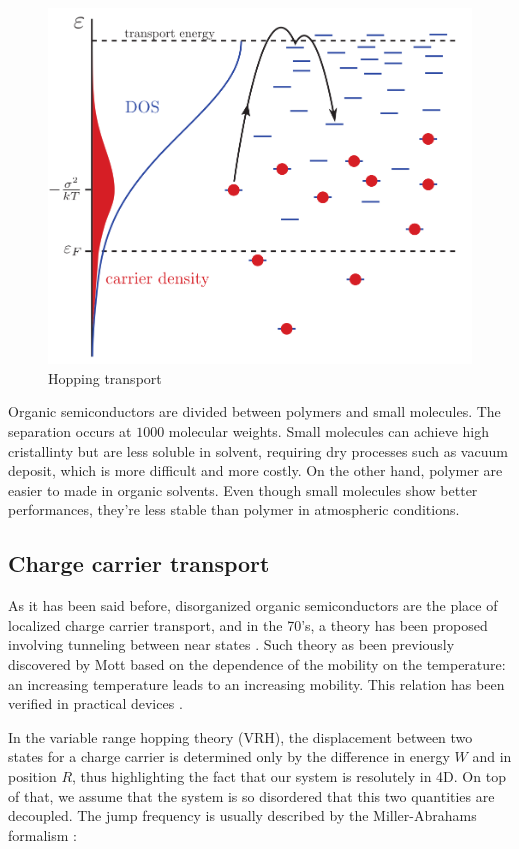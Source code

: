 \begin{figure}
    \centering
    \includegraphics*[width=0.4\paperwidth]{figures/hopping_theory.png}
    \caption{Hopping transport \label{fig:4}}
\end{figure}

Organic semiconductors are divided between polymers and small molecules. The separation occurs at $1000$ molecular weights. Small molecules can achieve high cristallinty but are less soluble in solvent, requiring dry processes such as vacuum deposit, which is more difficult and more costly. On the other hand, polymer are easier to made in organic solvents. Even though small molecules show better performances, they're less stable than polymer in atmospheric conditions.

\subsection{Charge carrier transport}

As it has been said before, disorganized organic semiconductors are the place of localized charge carrier transport, and in the 70's, a theory has been proposed involving tunneling between near states \cite{hopping_theory_1}. Such theory as been previously discovered by Mott based on the dependence of the mobility on the temperature: an increasing temperature leads to an increasing mobility. This relation has been verified in practical devices \cite{hopping_theory_1,multiple_theory}.

In the variable range hopping theory (VRH), the displacement between two states for a charge carrier is determined only by the difference in energy $W$ and in position $R$, thus highlighting the fact that our system is resolutely in 4D. On top of that, we assume that the system is so disordered that this two quantities are decoupled. The jump frequency is usually described by the Miller-Abrahams formalism \cite{miller}:

